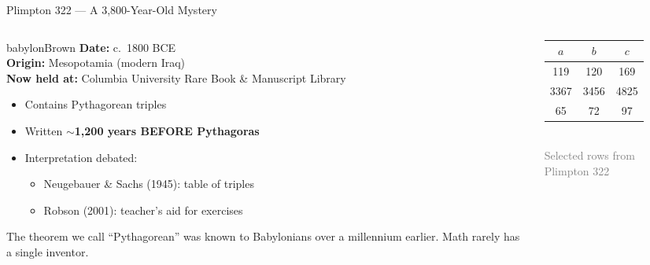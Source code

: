 \begin{frame}[shrink=25]{Plimpton 322 --- A 3,800-Year-Old Mystery}

  \begin{columns}[T]
    \begin{column}{0.55\textwidth}
      \begin{personbox}{babylonBrown}
        \small
        \textbf{Date:} c.\ 1800 BCE\\
        \textbf{Origin:} Mesopotamia (modern Iraq)\\
        \textbf{Now held at:} Columbia University Rare Book \& Manuscript Library
      \end{personbox}

      \vspace{0.4em}
      \begin{itemize}
        \item Contains \alert{Pythagorean triples}
        \item Written $\sim$\textbf{1,200 years BEFORE Pythagoras}
        \item Interpretation debated:
          \begin{itemize}
            \item Neugebauer \& Sachs (1945): table of triples
            \item Robson (2001): teacher's aid for exercises
          \end{itemize}
      \end{itemize}

      \vspace{0.3em}
      \begin{insightbox}
        The theorem we call ``Pythagorean'' was known to Babylonians over a millennium earlier. Math rarely has a single inventor.
      \end{insightbox}
    \end{column}

    \begin{column}{0.42\textwidth}

      \vspace{0.3em}
      {\small
      \begin{tabular}{ccc}
        \toprule
        $a$ & $b$ & $c$ \\
        \midrule
        119 & 120 & 169 \\
        3367 & 3456 & 4825 \\
        65 & 72 & 97 \\
        \bottomrule
      \end{tabular}
      }\\[0.2em]
      {\tiny\textcolor{gray}{Selected rows from Plimpton 322}}
    \end{column}
  \end{columns}


\end{frame}

